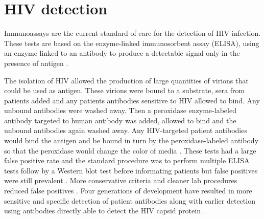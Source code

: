 \documentclass[../sherrill-Mix_thesis.tex]{subfiles}
\begin{document}




\section{HIV detection}
	Immunoassays are the current standard of care for the detection of HIV infection. These tests are based on the enzyme-linked immunosorbent assay (ELISA), using an enzyme linked to an antibody to produce a detectable signal only in the presence of antigen \citep{Yalow1960,Engvall1971,VanWeemen1971}. %
	
	  The isolation of HIV \citep{Barre-Sinoussi1983,Gallo1983,Popovic1984,Levy1984} allowed the production of large quantities of virions that could be used as antigen. These virions were bound to a substrate, sera from patients added and any patients antibodies sensitive to HIV allowed to bind. Any unbound antibodies were washed away. Then a peroxidase enzyme-labeled antibody targeted to human antibody was added, allowed to bind and the unbound antibodies again washed away. Any HIV-targeted patient antibodies would bind the antigen and be bound in turn by the peroxidase-labeled antibody so that the peroxidase would change the color of media \citep{Safai1984,Sarngadharan1984,Ward1986}. These tests had a large false positive rate and the standard procedure was to perform multiple ELISA tests follow by a Western blot test before informating patients \citep{Towbin1979,CDC1985} but false positives were still prevalent \citep{Burke1986}. More conservative criteria and cleaner lab procedures reduced false positives \citep{Burke1988}. Four generations of development \citep{Chappel2009} have resulted in more sensitive and specific detection of patient antibodies along with earlier detection using antibodies directly able to detect the HIV capsid protein \citep{Weber1998,Weber2002}.  
\end{document}
